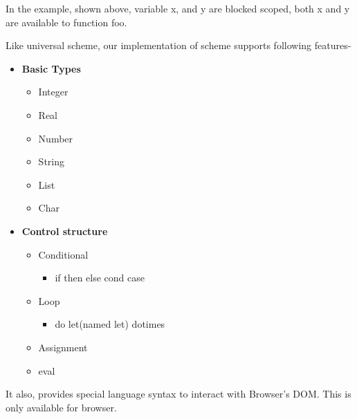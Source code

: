 In the example, shown above, variable x, and y are blocked scoped, both x and y are available to function foo.

Like universal scheme, our implementation of scheme supports following features- 



\begin{itemize}
	\item {\textbf{Basic Types}}
	\begin{itemize}
		\item Integer
		\item Real
		\item Number
		\item String
		\item List
		\item Char
	\end{itemize}
\end{itemize}

\begin{itemize}
	\item{\textbf{Control structure}}
	\begin{itemize}
		\item Conditional
		\begin{itemize}
			\item if then else cond case
		\end{itemize}
		\item Loop
		\begin{itemize}
			\item do let(named let) dotimes
		\end{itemize}
		\item Assignment
		\item eval
	\end{itemize}
\end{itemize}

It also, provides special language syntax to interact with Browser's DOM. 
This is only available for browser.

